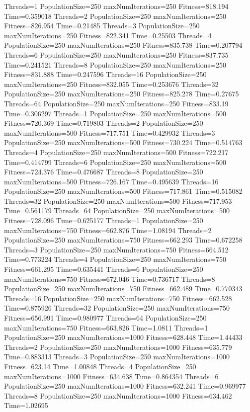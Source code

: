 \documentclass[10pt,letterpaper]{article}
\begin{document}
Threads=1 PopulationSize=250 maxNumIterations=250 Fitness=818.194 Time=0.359018
Threads=2 PopulationSize=250 maxNumIterations=250 Fitness=826.954 Time=0.21485
Threads=3 PopulationSize=250 maxNumIterations=250 Fitness=822.341 Time=0.25503
Threads=4 PopulationSize=250 maxNumIterations=250 Fitness=835.738 Time=0.207794
Threads=6 PopulationSize=250 maxNumIterations=250 Fitness=837.735 Time=0.241521
Threads=8 PopulationSize=250 maxNumIterations=250 Fitness=831.888 Time=0.247596
Threads=16 PopulationSize=250 maxNumIterations=250 Fitness=832.055 Time=0.253676
Threads=32 PopulationSize=250 maxNumIterations=250 Fitness=825.278 Time=0.27675
Threads=64 PopulationSize=250 maxNumIterations=250 Fitness=833.19 Time=0.306297
Threads=1 PopulationSize=250 maxNumIterations=500 Fitness=720.369 Time=0.719803
Threads=2 PopulationSize=250 maxNumIterations=500 Fitness=717.751 Time=0.429932
Threads=3 PopulationSize=250 maxNumIterations=500 Fitness=730.224 Time=0.514763
Threads=4 PopulationSize=250 maxNumIterations=500 Fitness=722.217 Time=0.414799
Threads=6 PopulationSize=250 maxNumIterations=500 Fitness=724.376 Time=0.476687
Threads=8 PopulationSize=250 maxNumIterations=500 Fitness=726.167 Time=0.495639
Threads=16 PopulationSize=250 maxNumIterations=500 Fitness=717.861 Time=0.515082
Threads=32 PopulationSize=250 maxNumIterations=500 Fitness=717.953 Time=0.561179
Threads=64 PopulationSize=250 maxNumIterations=500 Fitness=728.096 Time=0.625177
Threads=1 PopulationSize=250 maxNumIterations=750 Fitness=662.876 Time=1.08194
Threads=2 PopulationSize=250 maxNumIterations=750 Fitness=662.293 Time=0.672258
Threads=3 PopulationSize=250 maxNumIterations=750 Fitness=664.512 Time=0.773224
Threads=4 PopulationSize=250 maxNumIterations=750 Fitness=661.295 Time=0.635441
Threads=6 PopulationSize=250 maxNumIterations=750 Fitness=672.046 Time=0.736717
Threads=8 PopulationSize=250 maxNumIterations=750 Fitness=662.489 Time=0.770343
Threads=16 PopulationSize=250 maxNumIterations=750 Fitness=662.528 Time=0.875926
Threads=32 PopulationSize=250 maxNumIterations=750 Fitness=656.991 Time=0.980977
Threads=64 PopulationSize=250 maxNumIterations=750 Fitness=663.826 Time=1.0811
Threads=1 PopulationSize=250 maxNumIterations=1000 Fitness=628.448 Time=1.44433
Threads=2 PopulationSize=250 maxNumIterations=1000 Fitness=635.779 Time=0.883313
Threads=3 PopulationSize=250 maxNumIterations=1000 Fitness=623.14 Time=1.00848
Threads=4 PopulationSize=250 maxNumIterations=1000 Fitness=634.638 Time=0.864354
Threads=6 PopulationSize=250 maxNumIterations=1000 Fitness=632.241 Time=0.969977
Threads=8 PopulationSize=250 maxNumIterations=1000 Fitness=634.462 Time=1.02695
\end{document}

